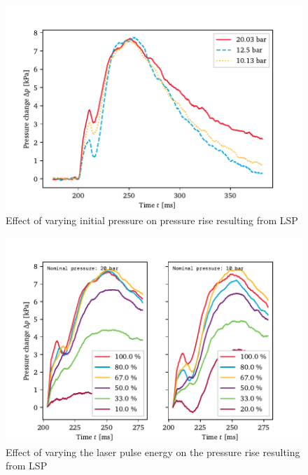     \begin{figure}[h]
        \centering
        \includegraphics[]{assets/5 results/pressure_pressures.pdf}
        \caption{Effect of varying initial pressure on pressure rise resulting from LSP}
        \label{fig:pressure_pressures}
    \end{figure}

    \begin{figure}[h]
        \centering
        \includegraphics[]{assets/5 results/pressure_powers.pdf}
        \caption{Effect of varying the laser pulse energy on the pressure rise resulting from LSP}
        \label{fig:pressure_powers}
    \end{figure}